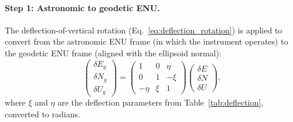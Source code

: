 \paragraph{Step 1: Astronomic to geodetic ENU.} The deflection-of-vertical rotation (Eq.~\ref{eq:deflection_rotation}) is applied to convert from the astronomic ENU frame (in which the instrument operates) to the geodetic ENU frame (aligned with the ellipsoid normal):
\begin{equation}
\begin{pmatrix} \delta E_g \\ \delta N_g \\ \delta U_g \end{pmatrix}
=
\begin{pmatrix}
1 & 0 & \eta \\
0 & 1 & -\xi \\
-\eta & \xi & 1
\end{pmatrix}
\begin{pmatrix} \delta E \\ \delta N \\ \delta U \end{pmatrix},
\label{eq:astro_to_geod}
\end{equation}
where $\xi$ and $\eta$ are the deflection parameters from Table~\ref{tab:deflection}, converted to radians.

